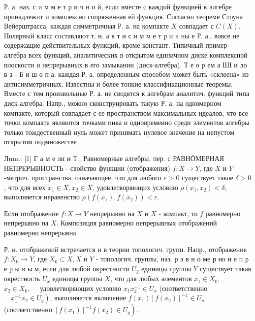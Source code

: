 \documentclass[10pt]{article}
\begin{document}
Р. а. наз. с и м м е т р и ч н о й, если вместе с каждой функцией к алгебре принадлежит и комплексно сопряженная ей функция. Согласно теореме Стоуна Вейерштрасса, каждая симметричная Р. а. на компакте $X$ совпадает с $C(X)$. Полярный класс составляют т. н. а в т и с и м м е т р и ч ны е Р. а., вовсе не содержащие действительных функций, кроме констант. Типичный пример - алгебра всех функций, аналитических в открытом единичном диске комплексной плоскости и непрерывных в его замыкании (диск-алгебра). Т е о р ем а ШІ и ло в а - Б и ш о п а: каждая Р. а. определенным способом может быть «склеена» из антисимметричных. Известны и более тонкие классификационные теоремы. Вместе с тем произвольные Р. а. не сводятся к алгебрам аналитич. функций типа диск-алгебра. Напр., можно сконструировать такую Р. а. на одномерном компакте, который совпадает с ее пространством максимальных идеалов, что все точки компакта являются точками пика и одновременно среди элементов алгебры только тождественный нуль может принимать нулевое значение на непустом открытом подмножестве .



Лum.: [1] Г а м е ли н Т., Равномерные алгебры, пер. с РАВНӦМЕРНАЯ НЕПРЕРЫВНОСТЬ - свойство функции (отображения) $f: X \rightarrow Y$, где $X$ и $Y$-метрич. пространства, означающее, что для любого $\varepsilon>0$ существует такое $\delta>0$, что для всех $x_{1} \in X, x_{2} \in X$, удовлетворяющих условию $\rho\left(x_{1}, x_{2}\right)<\delta$, выполняется неравенство $\rho\left(f\left(x_{1}\right), f\left(x_{2}\right)\right)<\varepsilon$.



Если отображение $f: X \rightarrow Y$ непрерывно на $X$ и $X$ - компакт, то $f$ равномерно непрерывно на $X$. Композиция равномерно непрерывных отображений равномерно непрерывна.



Р. н. отображений встречается и в теории топологич. групп. Напр., отображение $f: X_{0} \rightarrow Y$, где $X_{0} \subset X, X$ и $Y$ - топологич. группы, наз. р а в н о ме р но н е п р е р ы в ы м, если для любой окрестности $U_{y}$ единицы группы $Y$ существует такая окрестность $U_{x}$ единицы группы $X$, что для любых әлементов $x_{1} \in X_{0}$, $x_{2} \in X_{0}, \quad$ удовлетворяющих условию $x_{1} x_{2}^{-1} \in U_{x}$ (соответственно $\left.\quad x_{1}^{-1} x_{2} \in U_{y}\right)$, выполняется включение $f\left(x_{1}\right)\left[f\left(x_{2}\right)\right]^{-1} \in U_{y}$ (соответственно $\left.\left[f\left(x_{1}\right)\right]^{-1} f\left(x_{2}\right) \in U_{y}\right)$.
\end{document}
